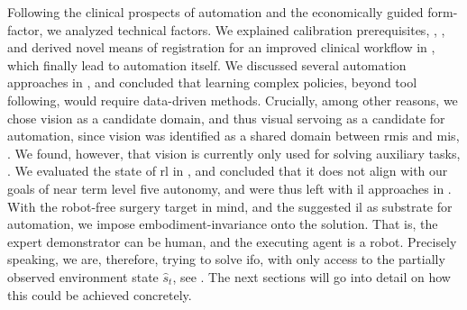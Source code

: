 Following the clinical prospects of automation and the economically guided form-factor, we analyzed technical factors. We explained calibration prerequisites, , , and derived novel means of registration for an improved clinical workflow in , which finally lead to automation itself. We discussed several automation approaches in , and concluded that learning complex policies, beyond tool following, would require data-driven methods. Crucially, among other reasons, we chose vision as a candidate domain, and thus visual servoing as a candidate for automation, since vision was identified as a shared domain between \gls{rmis} and \gls{mis}, . We found, however, that vision is currently only used for solving auxiliary tasks, . We evaluated the state of \gls{rl} in , and concluded that it does not align with our goals of near term level five autonomy, and were thus left with \gls{il} approaches in . With the robot-free surgery target in mind, and the suggested \gls{il} as substrate for automation, we impose embodiment-invariance onto the solution. That is, the expert demonstrator can be human, and the executing agent is a robot. Precisely speaking, we are, therefore, trying to solve \gls{ifo}, with only access to the partially observed environment state $\hat{s}_t$, see . The next sections will go into detail on how this could be achieved concretely.

